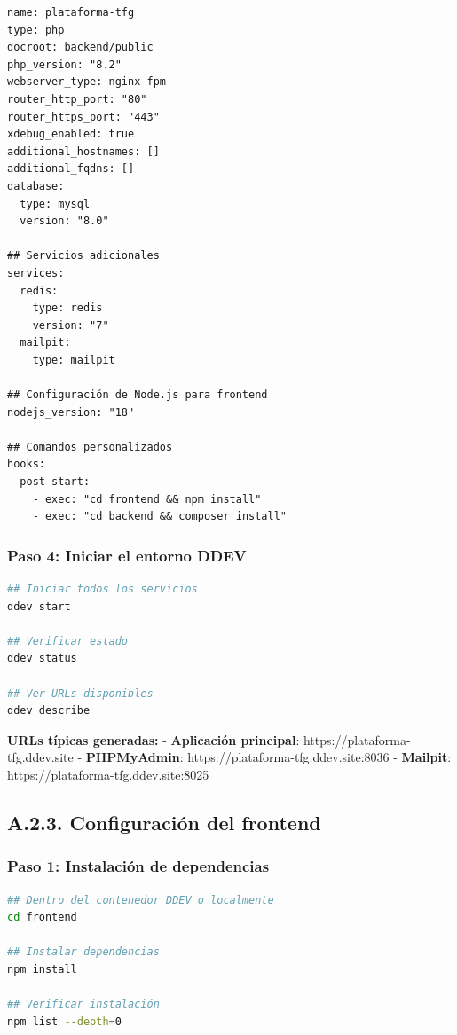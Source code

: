\documentclass[12pt,a4paper,oneside]{report}
\begin{document}
\begin{lstlisting}
name: plataforma-tfg
type: php
docroot: backend/public
php_version: "8.2"
webserver_type: nginx-fpm
router_http_port: "80"
router_https_port: "443"
xdebug_enabled: true
additional_hostnames: []
additional_fqdns: []
database:
  type: mysql
  version: "8.0"
  
## Servicios adicionales
services:
  redis:
    type: redis
    version: "7"
  mailpit:
    type: mailpit

## Configuración de Node.js para frontend
nodejs_version: "18"

## Comandos personalizados
hooks:
  post-start:
    - exec: "cd frontend && npm install"
    - exec: "cd backend && composer install"
\end{lstlisting}

\subsubsection{Paso 4: Iniciar el entorno
DDEV}\label{paso-4-iniciar-el-entorno-ddev}

\begin{lstlisting}[language=bash]
## Iniciar todos los servicios
ddev start

## Verificar estado
ddev status

## Ver URLs disponibles
ddev describe
\end{lstlisting}

\textbf{URLs típicas generadas:} - \textbf{Aplicación principal}:
https://plataforma-tfg.ddev.site - \textbf{PHPMyAdmin}:
https://plataforma-tfg.ddev.site:8036 - \textbf{Mailpit}:
https://plataforma-tfg.ddev.site:8025

\subsection{A.2.3. Configuración del
frontend}\label{a.2.3.-configuraciuxf3n-del-frontend}

\subsubsection{Paso 1: Instalación de
dependencias}\label{paso-1-instalaciuxf3n-de-dependencias}

\begin{lstlisting}[language=bash]
## Dentro del contenedor DDEV o localmente
cd frontend

## Instalar dependencias
npm install

## Verificar instalación
npm list --depth=0
\end{lstlisting}
\end{document}

